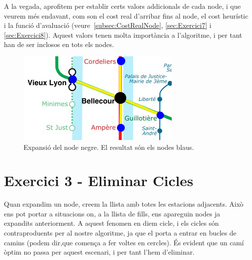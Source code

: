 \documentclass[a4paper,12pt,hidelinks]{article}
\begin{document}
            A la vegada, aprofitem per establir certs valors addicionals de cada node, i que veurem més endavant, com son el cost real d’arribar fins al node, el cost heurístic i la funció d'avaluació (veure~\ref{subsec:CostRealNode}, \ref{sec:Exercici7} i \ref{sec:Exercici8}). Aquest valors tenen molta importància a l’algoritme, i per tant han de ser inclosos en tots els nodes.
            \begin{figure}[h]
                \centering    
                \includegraphics[scale=1]{expansion.png}
                \caption{Expansió del node negre. El resultat són els nodes blaus.}
            \end{figure}

        \section{Exercici 3 - Eliminar Cicles}
        \label{sec:Exercici3}

            Quan expandim un node, creem la llista amb totes les estacions adjacents. Això ens pot portar a situacions on, a la llista de fills, ens apareguin nodes ja expandits anteriorment. A aquest fenomen en diem cicle, i els cicles són contraproduents per al nostre algoritme, ja que el porta a entrar en bucles de camins (podem dir,que comença a fer voltes en cercles). És evident que un camí òptim no passa per aquest escenari, i per tant l’hem d’eliminar.
\end{document}
